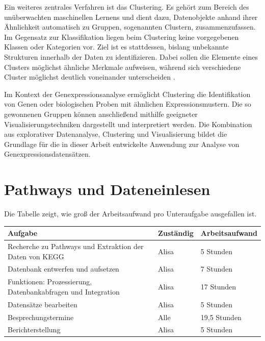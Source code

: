 \documentclass[12pt]{article}
\begin{document}
Ein weiteres zentrales Verfahren ist das Clustering. Es gehört zum Bereich des unüberwachten maschinellen Lernens und dient dazu, Datenobjekte anhand ihrer Ähnlichkeit automatisch zu Gruppen, sogenannten Clustern, zusammenzufassen. Im Gegensatz zur Klassifikation liegen beim Clustering keine vorgegebenen Klassen oder Kategorien vor. Ziel ist es stattdessen, bislang unbekannte Strukturen innerhalb der Daten zu identifizieren. Dabei sollen die Elemente eines Clusters möglichst ähnliche Merkmale aufweisen, während sich verschiedene Cluster möglichst deutlich voneinander unterscheiden \cite{Rokach2005}.

Im Kontext der Genexpressionsanalyse ermöglicht Clustering die Identifikation von Genen oder biologischen Proben mit ähnlichen Expressionsmustern. Die so gewonnenen Gruppen können anschließend mithilfe geeigneter Visualisierungstechniken dargestellt und interpretiert werden. Die Kombination aus explorativer Datenanalyse, Clustering und Visualisierung bildet die Grundlage für die in dieser Arbeit entwickelte Anwendung zur Analyse von Genexpressionsdatensätzen.

\newpage
\pagestyle{fancy}
\fancyhead{}
\section{Pathways und Dateneinlesen}
\label{pathways}

Die Tabelle zeigt, wie groß der Arbeitsaufwand pro Unteraufgabe ausgefallen ist.
\begin{table}[h!]
	\centering
	\begin{tabular}{p{8cm}|l|l}
		Aufgabe & Zuständig & Arbeitsaufwand \\ 
		\hline
		Recherche zu Pathways und Extraktion der Daten von KEGG & Alisa & 5 Stunden \\
		Datenbank entwerfen und aufsetzen & Alisa & 7 Stunden \\ 
		Funktionen: Prozessierung, Datenbankabfragen und Integration & Alisa & 17 Stunden \\ 
		Datensätze bearbeiten & Alisa & 5 Stunden \\          
		Besprechungstermine & Alle & 19,5 Stunden \\    
		Berichterstellung & Alisa & 5 Stunden \\    
	\end{tabular}
\end{table}
\end{document}
